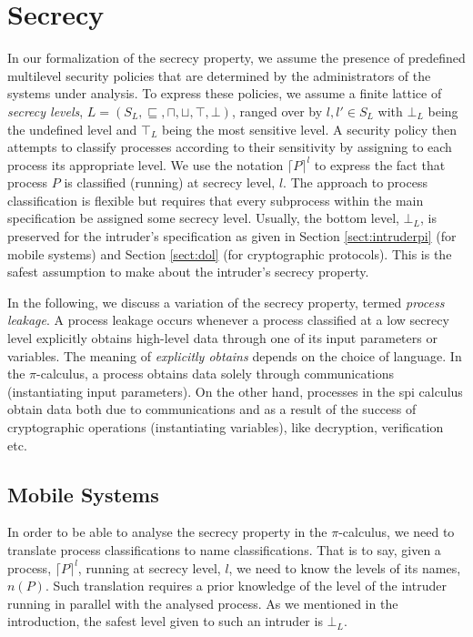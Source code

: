\documentclass[10pt,a4paper,final,oneside,fleqn]{book}
\begin{document}
\section{Secrecy}
In our formalization of the secrecy property, we assume the presence of predefined multilevel security policies that are determined by the administrators of the systems under analysis.  To express these policies, we assume a finite lattice of {\itshape secrecy levels\/}, $L=(S_L,\sqsubseteq,\sqcap,\sqcup,\top,\bot)$, ranged over by $l,l'\in S_L$ with $\bot_L$ being the undefined level and $\top_L$ being the most sensitive level.  A security policy then attempts to classify processes according to their sensitivity by assigning to each process its appropriate level.  We use the notation $\lceil P\rceil^l$ to express the fact that process $P$ is classified (running) at secrecy level, $l$. The approach to process classification is flexible but requires that every subprocess within the main specification be assigned some secrecy level.  Usually, the bottom level, $\bot_{L}$, is preserved for the intruder's specification as given in Section \ref{sect:intruderpi} (for mobile systems) and Section \ref{sect:dol} (for cryptographic protocols).  This is the safest assumption to make about the intruder's secrecy property.

In the following, we discuss a variation of the secrecy property, termed {\itshape process leakage\/}. A process leakage occurs whenever a process classified at a low secrecy level explicitly obtains high-level data through one of its input parameters or variables. The meaning of \textit{explicitly obtains} depends on the choice of language.  In the $\pi$-calculus, a process obtains data solely through communications (instantiating input parameters).  On the other hand, processes in the spi calculus obtain data both due to communications and as a result of the success of cryptographic operations (instantiating variables), like decryption, verification etc.
\subsection{Mobile Systems\label{sect:procleakpi}}
In order to be able to analyse the secrecy property in the $\pi$-calculus, we need to translate process classifications to name classifications.  That is to say, given a process, $\lceil P\rceil^l$, running at secrecy level, $l$, we need to know the levels of its names, $n(P)$.  Such translation requires a prior knowledge of the level of the intruder running in parallel with the analysed process. As we mentioned in the introduction, the safest level given to such an intruder is $\bot_L$.
\end{document}
